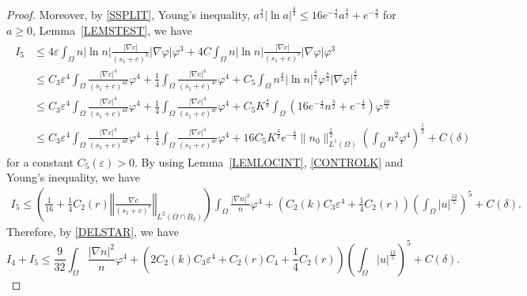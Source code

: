 \documentclass{amsart}
\numberwithin{equation}{section}
\newcommand{\R}{{ \mathbb{R}  }}
\newcommand{\bke}[1]{\left( #1 \right)}
\newcommand{\norm}[1]{\left\Vert #1 \right\Vert}
\begin{document}
\begin{proof}
Moreover, by \eqref{SSPLIT}, Young's inequality, $a^{\frac{4}{3}}|\ln a|^{\frac{4}{3}}\le 16e^{-\frac{4}{3}} a^{\frac{3}{2}}+e^{-\frac{4}{3}}$ for $a\ge0$, Lemma~\ref{LEMSTEST}, we have
\begin{align*}
\begin{aligned}
I_5 
&\le  4\varepsilon\int_{\Omega} n|\ln n| \frac{|\nabla c|}{(s_{1}+c)^{k}}|\nabla \varphi| \varphi^{3}+ 4C\int_{\Omega} n|\ln n| \frac{|\nabla c|}{(s_{1}+c)^{r}}|\nabla \varphi| \varphi^{3}
\\&
\le C_{3}\varepsilon^{4}\int_{\Omega}\frac{|\nabla c|^{4}}{(s_{1}+c)^{4k}}\varphi^{4}+\frac{1}{4}\int_{\Omega}\frac{|\nabla c|^{4}}{(s_{1}+c)^{4r}}\varphi^{4}+C_{5}\int_{\Omega} n^{\frac{4}{3}}|\ln n|^{\frac{4}{3}}\varphi^{\frac{8}{3}}|\nabla \varphi|^{\frac{4}{3}}
\\&
\le C_{3}\varepsilon^{4}\int_{\Omega}\frac{|\nabla c|^{4}}{(s_{1}+c)^{4k}}\varphi^{4}+\frac{1}{4}\int_{\Omega}\frac{|\nabla c|^{4}}{(s_{1}+c)^{4r}}\varphi^{4}+C_{5}K^{\frac{4}{3}}\int_{\Omega} (16e^{-\frac{4}{3}} n^{\frac{3}{2}}+e^{-\frac{4}{3}})\varphi^{\frac{10}{3}} 
\\&
\le C_{3}\varepsilon^{4}\int_{\Omega}\frac{|\nabla c|^{4}}{(s_{1}+c)^{4k}}\varphi^{4}
+\frac{1}{4}\int_{\Omega}\frac{|\nabla c|^{4}}{(s_{1}+c)^{4r}}\varphi^{4}
+16C_{5}K^{\frac{4}{3}} e^{-\frac{4}{3}}\|n_{0}\|_{L^{1}(\Omega)}^{\frac{1}{2}}\bke{\int_{\Omega}n^{2}\varphi^{4}}^{\frac{1}{2}}
+C(\delta)
\end{aligned}
\end{align*}
for a constant $C_{5}(\varepsilon)>0$.
By using Lemma~\ref{LEMLOCINT}, \eqref{CONTROLK} and Young's inequality, we have
\begin{equation}
\begin{aligned}
I_5
\le  \left(\frac{1}{16} +\frac{1}{4}C_{2}(r)  \norm{\frac{\nabla c}{(s_{1}+c)^{r}}}_{L^{2}(\Omega\cap B_{\delta})} \right)\int_{\Omega} \frac{|\nabla n|^{2}}{n}\varphi^{4}+\left(C_{2}(k)C_{3}\varepsilon^{4}+\frac{1}{4}C_{2}(r)\right)\bke{\int_{\Omega}|u|^{\frac{12}{5}} }^{5}
+C(\delta).
\end{aligned}
\end{equation}
Therefore, by \eqref{DELSTAR}, we have 
\begin{equation}\label{I4+I5}
I_4 + I_5 \leq \frac{9}{32}\int_{\Omega} \frac{|\nabla n|^{2}}{n}\varphi^{4} +\left(2C_{2}(k)C_{3}\varepsilon^{4}+C_{2}(r)C_{4}+\frac{1}{4}C_{2}(r)\right)\bke{\int_{\Omega}|u|^{\frac{12}{5}} }^{5}
+C(\delta).
\end{equation}


\end{proof}
\end{document}
